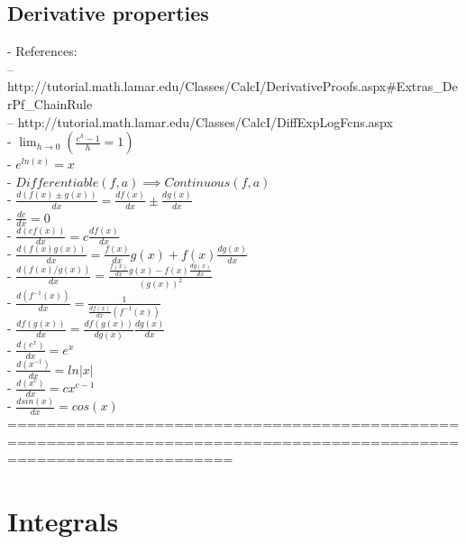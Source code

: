 \documentclass{book}
\begin{document}
\subsection{Derivative properties} %
	- References: \\
		-- http://tutorial.math.lamar.edu/Classes/CalcI/DerivativeProofs.aspx#Extras_DerPf_ChainRule \\
		-- http://tutorial.math.lamar.edu/Classes/CalcI/DiffExpLogFcns.aspx \\
	- $\lim_{h \to 0} (\frac{e^h - 1}{h} = 1)$ \\
	- $e^{ln(x)} = x$ \\
	- $Differentiable(f, a) \implies Continuous(f, a)$ \\
	- $\frac{d(f(x) \pm g(x))}{dx} = \frac{df(x)}{dx} \pm \frac{dg(x)}{dx}$ \\
	- $\frac{dc}{dx} = 0$ \\
	- $\frac{d(c f(x))}{dx} = c \frac{df(x)}{dx}$ \\
	- $\frac{d(f(x) g(x))}{dx} = \frac{f(x)}{dx} g(x) + f(x) \frac{dg(x)}{dx}$ \\
	- $\frac{d(f(x) / g(x))}{dx} =  \frac{\frac{f(x)}{dx} g(x) - f(x) \frac{dg(x)}{dx}}{(g(x))^2}$ \\
	- $\frac{d(f^{-1}(x))}{dx} = \frac{1}{\frac{df(x)}{dx}(f^{-1}(x))}$ \\
	- $\frac{df(g(x))}{dx} = \frac{df(g(x))}{dg(x)} \frac{dg(x)}{dx}$ \\ %
	- $\frac{d(e^x)}{dx} = e^x$ \\ %
	- $\frac{d(x^{-1})}{dx} = ln|x|$ \\
	- $\frac{d(x^c)}{dx} = c x^{c-1}$ \\
	- $\frac{dsin(x)}{dx} = cos(x)$ \\
	===================================================================================================================

\section{Integrals}
\end{document}
